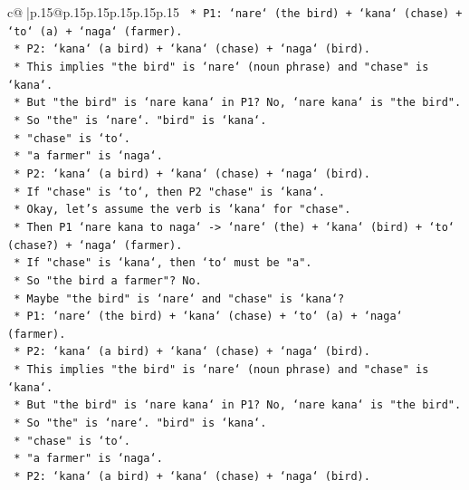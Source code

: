 \documentclass{article}
\begin{document}
{\begin{supertabular}{c@{$\;$}|p{.15\linewidth}@{}p{.15\linewidth}p{.15\linewidth}p{.15\linewidth}p{.15\linewidth}p{.15\linewidth}}
{{{\texttt{            *   P1: `nare` (the bird) + `kana` (chase) + `to` (a) + `naga` (farmer).} \\
\texttt{            *   P2: `kana` (a bird) + `kana` (chase) + `naga` (bird).} \\
\texttt{            *   This implies "the bird" is `nare` (noun phrase) and "chase" is `kana`.} \\
\texttt{            *   But "the bird" is `nare kana` in P1? No, `nare kana` is "the bird".} \\
\texttt{            *   So "the" is `nare`. "bird" is `kana`.} \\
\texttt{            *   "chase" is `to`.} \\
\texttt{            *   "a farmer" is `naga`.} \\
\texttt{            *   P2: `kana` (a bird) + `kana` (chase) + `naga` (bird).} \\
\texttt{            *   If "chase" is `to`, then P2 "chase" is `kana`.} \\
\texttt{            *   Okay, let's assume the verb is `kana` for "chase".} \\
\texttt{            *   Then P1 `nare kana to naga` {-}> `nare` (the) + `kana` (bird) + `to` (chase?) + `naga` (farmer).} \\
\texttt{            *   If "chase" is `kana`, then `to` must be "a".} \\
\texttt{            *   So "the bird a farmer"? No.} \\
\texttt{            *   Maybe "the bird" is `nare` and "chase" is `kana`?} \\
\texttt{            *   P1: `nare` (the bird) + `kana` (chase) + `to` (a) + `naga` (farmer).} \\
\texttt{            *   P2: `kana` (a bird) + `kana` (chase) + `naga` (bird).} \\
\texttt{            *   This implies "the bird" is `nare` (noun phrase) and "chase" is `kana`.} \\
\texttt{            *   But "the bird" is `nare kana` in P1? No, `nare kana` is "the bird".} \\
\texttt{            *   So "the" is `nare`. "bird" is `kana`.} \\
\texttt{            *   "chase" is `to`.} \\
\texttt{            *   "a farmer" is `naga`.} \\
\texttt{            *   P2: `kana` (a bird) + `kana` (chase) + `naga` (bird).} \\
}}}
\end{supertabular}}
\end{document}
